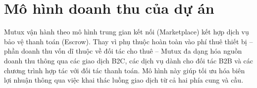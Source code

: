\section{Mô hình doanh thu của dự án}
Mutux vận hành theo mô hình trung gian kết nối (Marketplace) kết hợp dịch vụ bảo vệ thanh toán (Escrow). Thay vì phụ thuộc hoàn toàn vào phí thuê thiết bị – phần doanh thu vốn dĩ thuộc về đối tác cho thuê – Mutux đa dạng hóa nguồn doanh thu thông qua các giao dịch B2C, các dịch vụ dành cho đối tác B2B và các chương trình hợp tác với đối tác thanh toán. Mô hình này giúp tối ưu hóa biên lợi nhuận thông qua việc khai thác luồng giao dịch từ cả hai phía cung và cầu.
